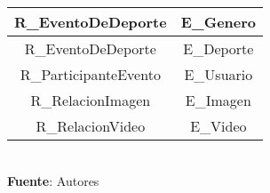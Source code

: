 \begin{table}[!htb]
\begin{center}
{\begin{tabular}{|p{4cm}|p{4cm}|p{4cm}|p{4cm}|}
			\hline
			\multicolumn{2}{|c|}{R\_EventoDeDeporte} & 
			\multicolumn{2}{c|}{E\_Genero} \\
			\hline
			\multicolumn{2}{|c|}{R\_EventoDeDeporte} & 
			\multicolumn{2}{c|}{E\_Deporte} \\
			\hline
			\multicolumn{2}{|c|}{R\_ParticipanteEvento} & 
			\multicolumn{2}{c|}{E\_Usuario} \\
			\hline
			\multicolumn{2}{|c|}{R\_RelacionImagen} & 
			\multicolumn{2}{c|}{E\_Imagen} \\
			\hline
			\multicolumn{2}{|c|}{R\_RelacionVideo} & 
			\multicolumn{2}{c|}{E\_Video} \\
			\hline
		\end{tabular}
		} \\
		\textbf{Fuente}: Autores
	\end{center}
\end{table}